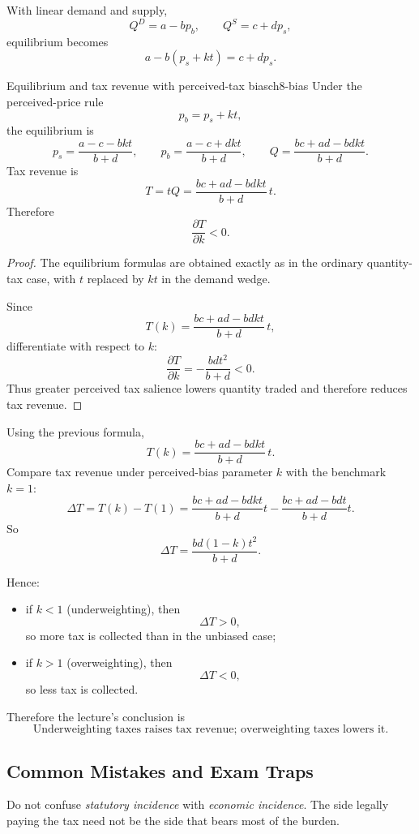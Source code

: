 With linear demand and supply,
\[
Q^D=a-bp_b,
\qquad
Q^S=c+dp_s,
\]
equilibrium becomes
\[
a-b(p_s+kt)=c+dp_s.
\]

\begin{theorem}{Equilibrium and tax revenue with perceived-tax bias}{ch8-bias}
Under the perceived-price rule
\[
p_b=p_s+kt,
\]
the equilibrium is
\[
p_s=\frac{a-c-bkt}{b+d},
\qquad
p_b=\frac{a-c+dkt}{b+d},
\qquad
Q=\frac{bc+ad-bdkt}{b+d}.
\]
Tax revenue is
\[
T=tQ
=
\frac{bc+ad-bdkt}{b+d}\,t.
\]
Therefore
\[
\frac{\partial T}{\partial k}<0.
\]
\end{theorem}

\begin{proof}
The equilibrium formulas are obtained exactly as in the ordinary quantity-tax case, with $t$ replaced by $kt$ in the demand wedge.

Since
\[
T(k)=\frac{bc+ad-bdkt}{b+d}\,t,
\]
differentiate with respect to $k$:
\[
\frac{\partial T}{\partial k}
=
-\frac{bdt^2}{b+d}<0.
\]
Thus greater perceived tax salience lowers quantity traded and therefore reduces tax revenue.
\end{proof}

\begin{examplebox}[title={Worked Example: effect of underweighting and overweighting taxes}]
Using the previous formula,
\[
T(k)=\frac{bc+ad-bdkt}{b+d}\,t.
\]
Compare tax revenue under perceived-bias parameter $k$ with the benchmark $k=1$:
\[
\Delta T
=
T(k)-T(1)
=
\frac{bc+ad-bdkt}{b+d}t - \frac{bc+ad-bdt}{b+d}t.
\]
So
\[
\Delta T
=
\frac{bd(1-k)t^2}{b+d}.
\]

Hence:
\begin{itemize}
    \item if $k<1$ (underweighting), then
    \[
    \Delta T>0,
    \]
    so more tax is collected than in the unbiased case;
    \item if $k>1$ (overweighting), then
    \[
    \Delta T<0,
    \]
    so less tax is collected.
\end{itemize}

Therefore the lecture's conclusion is
\[
\boxed{\text{Underweighting taxes raises tax revenue; overweighting taxes lowers it.}}
\]
\end{examplebox}

\subsection{Common Mistakes and Exam Traps}

\begin{commonmistake}
Do not confuse \emph{statutory incidence} with \emph{economic incidence}. The side legally paying the tax need not be the side that bears most of the burden.
\end{commonmistake}

